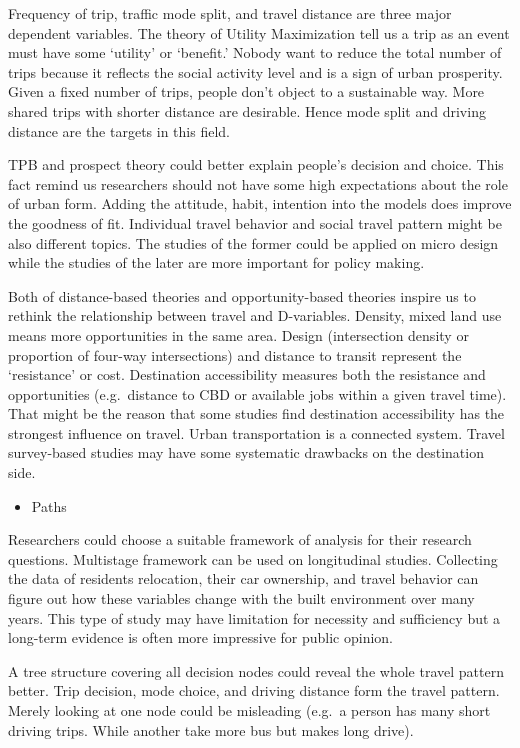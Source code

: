 \documentclass[
  11pt,
  openany]{memoir}
\providecommand{\tightlist}{%
  \setlength{\itemsep}{0pt}\setlength{\parskip}{0pt}}
\begin{document}
Frequency of trip, traffic mode split, and travel distance are three major dependent variables.
The theory of Utility Maximization tell us a trip as an event must have some `utility' or `benefit.'
Nobody want to reduce the total number of trips because it reflects the social activity level and is a sign of urban prosperity.
Given a fixed number of trips, people don't object to a sustainable way. More shared trips with shorter distance are desirable.
Hence mode split and driving distance are the targets in this field.

TPB and prospect theory could better explain people's decision and choice.
This fact remind us researchers should not have some high expectations about the role of urban form.
Adding the attitude, habit, intention into the models does improve the goodness of fit.
Individual travel behavior and social travel pattern might be also different topics.
The studies of the former could be applied on micro design while the studies of the later are more important for policy making.

Both of distance-based theories and opportunity-based theories inspire us to rethink the relationship between travel and D-variables.
Density, mixed land use means more opportunities in the same area.
Design (intersection density or proportion of four-way intersections) and distance to transit represent the `resistance' or cost.
Destination accessibility measures both the resistance and opportunities (e.g.~distance to CBD or available jobs within a given travel time).
That might be the reason that some studies find destination accessibility has the strongest influence on travel.
Urban transportation is a connected system. Travel survey-based studies may have some systematic drawbacks on the destination side.

\begin{itemize}
\tightlist
\item
  Paths
\end{itemize}

Researchers could choose a suitable framework of analysis for their research questions.
Multistage framework can be used on longitudinal studies. Collecting the data of residents relocation, their car ownership, and travel behavior can figure out how these variables change with the built environment over many years.
This type of study may have limitation for necessity and sufficiency but a long-term evidence is often more impressive for public opinion.

A tree structure covering all decision nodes could reveal the whole travel pattern better. Trip decision, mode choice, and driving distance form the travel pattern. Merely looking at one node could be misleading (e.g.~a person has many short driving trips. While another take more bus but makes long drive).
\end{document}
